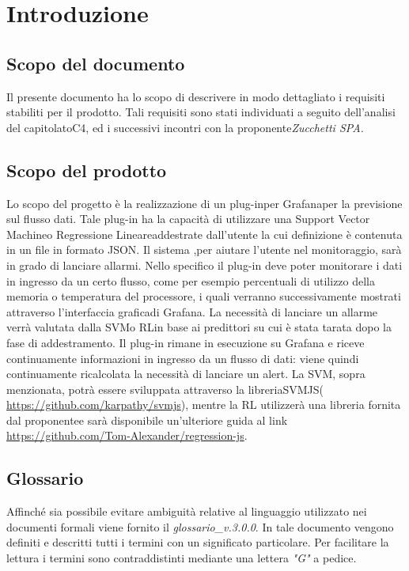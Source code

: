 \section{Introduzione}
	\subsection{Scopo del documento}
		Il presente documento ha lo scopo di descrivere in modo dettagliato i requisiti stabiliti per il prodotto. Tali requisiti sono stati individuati a seguito dell'analisi del capitolato\glo C4, ed i successivi incontri con la proponente\glo \emph{Zucchetti SPA.}

	
\subsection{Scopo del prodotto}
   Lo scopo del progetto è la realizzazione di un plug-in\glo per Grafana\glo per la previsione sul flusso dati\glo. Tale plug-in ha la capacità di utilizzare una Support Vector Machine\glo o Regressione Lineare\glo addestrate dall'utente la cui definizione è contenuta in un file in formato JSON\glo. Il sistema ,per aiutare l’utente nel monitoraggio, sarà in grado di lanciare allarmi.
Nello specifico il plug-in deve poter monitorare i dati in ingresso da un certo flusso, come per esempio percentuali di utilizzo della memoria o temperatura del processore, i quali verranno successivamente mostrati attraverso l'interfaccia grafica\glo di Grafana.
La necessità di lanciare un allarme verrà valutata dalla SVM\glo o RL\glo in base ai predittori su cui è stata tarata dopo la fase di addestramento.
Il plug-in rimane in esecuzione su Grafana e riceve continuamente informazioni in ingresso da un flusso di dati: viene quindi continuamente ricalcolata la necessità di lanciare un alert\glo.
La SVM, sopra menzionata, potrà essere sviluppata attraverso la libreria\glo SVMJS\glo (\url{ https://github.com/karpathy/svmjs}), mentre la RL utilizzerà una libreria fornita dal proponente\glo e sarà disponibile un’ulteriore guida al link \url{https://github.com/Tom-Alexander/regression-js}.

	
	\subsection{Glossario}
		Affinché sia possibile evitare ambiguità relative al linguaggio utilizzato nei documenti formali viene fornito il \emph{glossario\_v.3.0.0}. In tale documento vengono definiti e descritti tutti i termini con un significato particolare. Per facilitare la lettura i termini sono contraddistinti mediante una lettera \emph{"G"} a pedice.
		
